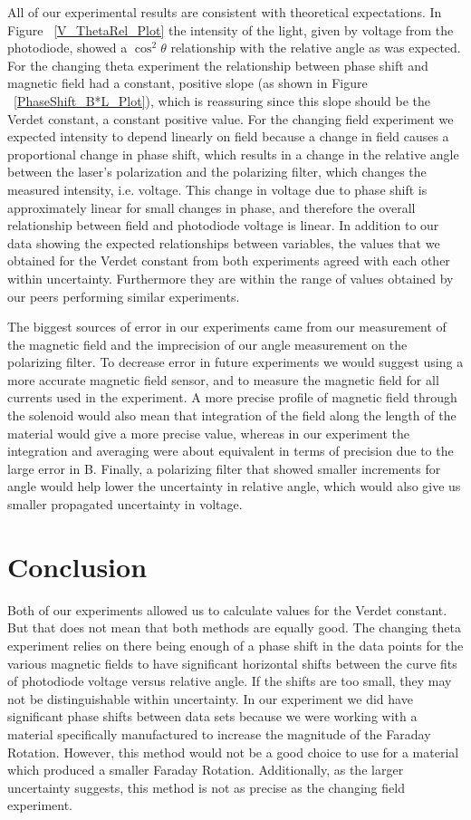 \documentclass[prb,preprint]{revtex4-1}
\begin{document}
All of our experimental results are consistent with theoretical expectations. In Figure ~\ref{V_ThetaRel_Plot} the intensity of the light, given by voltage from the photodiode, showed a $\cos^2\theta$ relationship with the relative angle as was expected. For the changing theta experiment the relationship between phase shift and magnetic field had a constant, positive slope (as shown in Figure ~\ref{PhaseShift_B*L_Plot}), which is reassuring since this slope should be the Verdet constant, a constant positive value.  For the changing field experiment we expected intensity to depend linearly on field because a change in field causes a proportional change in phase shift, which results in a change in the relative angle between the laser's polarization and the polarizing filter, which changes the measured intensity, i.e. voltage.  This change in voltage due to phase shift is approximately linear for small changes in phase, and therefore the overall relationship between field and photodiode voltage is linear. In addition to our data showing the expected relationships between variables, the values that we obtained for the Verdet constant from both experiments agreed with each other within uncertainty. Furthermore they are within the range of values obtained by our peers performing similar experiments.

The biggest sources of error in our experiments came from our measurement of the magnetic field and the imprecision of our angle measurement on the polarizing filter. To decrease error in future experiments we would suggest using a more accurate magnetic field sensor, and to measure the magnetic field for all currents used in the experiment. A more precise profile of magnetic field through the solenoid would also mean that integration of the field along the length of the material would give a more precise value, whereas in our experiment the integration and averaging were about equivalent in terms of precision due to the large error in B. Finally, a polarizing filter that showed smaller increments for angle would help lower the uncertainty in relative angle, which would also give us smaller propagated uncertainty in voltage. 

\section{Conclusion}

Both of our experiments allowed us to calculate values for the Verdet constant. But that does not mean that both methods are equally good. The changing theta experiment relies on there being enough of a phase shift in the data points for the various magnetic fields to have significant horizontal shifts between the curve fits of photodiode voltage versus relative angle. If the shifts are too small, they may not be distinguishable within uncertainty. In our experiment we did have significant phase shifts between data sets because we were working with a material specifically manufactured to increase the magnitude of the Faraday Rotation. However, this method would not be a good choice to use for a material which produced a smaller Faraday Rotation. Additionally, as the larger uncertainty suggests, this method is not as precise as the changing field experiment.
\end{document}
